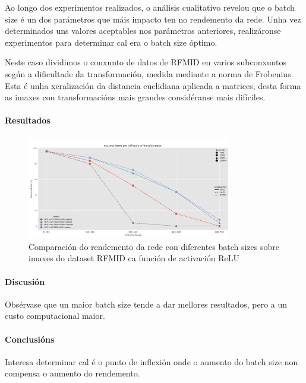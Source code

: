 Ao longo dos experimentos realizados, o análisis cualitativo revelou que o batch size é un dos parámetros que máis impacto ten no rendemento da rede.
Unha vez determinados uns valores aceptables nos parámetros anteriores, realizáronse experimentos para determinar cal era o batch size óptimo.

Neste caso dividimos o conxunto de datos de RFMID en varios subconxuntos según a dificultade da transformación, medida mediante a norma de Frobenius.
Esta é unha xeralización da distancia euclidiana aplicada a matrices, desta forma as imaxes con transformacións mais grandes considéranse mais difíciles.


\paragraph{Resultados}
\label{par:Resultados}


\begin{figure}[ht] 
    \centering
    \includegraphics[width=0.8\textwidth]{imaxes/experiment_plot_RFMID_MLP_1e-05.png}
    \caption{Comparación do rendemento da rede con diferentes batch sizes sobre imaxes do dataset RFMID ca función de activación ReLU}
    \label{fig:batch_size_comparison_relu}
\end{figure}

\paragraph{Discusión}
\label{par:Discusión}

Obsérvase que un maior batch size tende a dar mellores resultados, pero a un custo computacional maior. 

\paragraph{Conclusións}
\label{par:Conclusións}

Interesa determinar cal é o punto de inflexión onde o aumento do batch size non compensa o aumento do rendemento.

